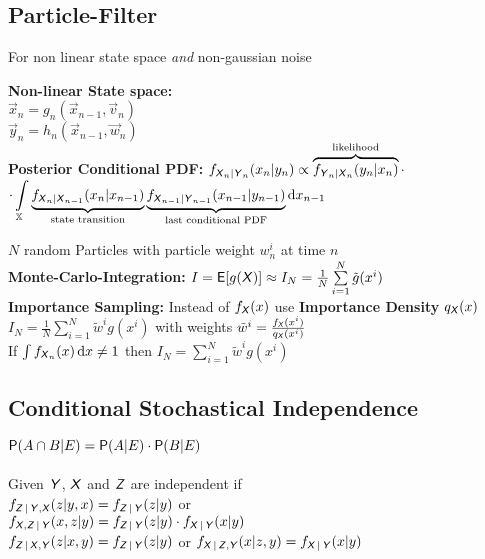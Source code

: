 \begin{sectionbox}
	\subsection{Particle-Filter}
	For non linear state space \emph{and} non-gaussian noise

	\textbf{Non-linear State space:}\\
	$\vec x_n = g_n(\vec x_{n−1}, \vec v_n)$\\
	$\vec y_n = h_n(\vec x_{n−1}, \vec w_n)$\\


	\textbf{Posterior Conditional PDF:} $f_{\X_n\!|\!\Y_n}(x_n|y_n) \propto \overbrace{ f_{\Y_n\!|\!\X_n}(y_n|x_n) }^{\text{likelihood}} \cdot$\\
	${ \displaystyle \cdot \int\limits_{\mathbb X} \underbrace{ f_{\X_n\!|\!\X_{n-1}}(x_n|x_{n-1}) }_{\text{state transition}} \underbrace{ f_{\X_{n-1}\!|\!\Y_{n-1}}(x_{n-1}|y_{n-1}) }_{\text{last conditional PDF}} \diff x_{n-1} }$


	$N$ random Particles with particle weight $w_n^i$ at time $n$\\
	\textbf{Monte-Carlo-Integration:}
	$I = \E[g(\X)] \approx I_N = \frac{1}{N} \sum\limits_{i=1}^{N} \tilde g(x^i)$\\
	\textbf{Importance Sampling:} Instead of $f_{\X}(x)$ use \textbf{Importance Density} $q_{\X}(x)$\\
	$I_N = \frac{1}{N} \sum\limits_{i=1}^{N} \tilde w^i g(x^i)$ with weights $\tilde w^i = \frac{f_{\X}(x^i)}{q_{\X}(x^i)}$\\
	If $\int f_{\X_n}(x) \diff x \ne 1$ then $I_N = \sum\limits_{i=1}^{N} \tilde w^i g(x^i)$\\
\end{sectionbox}

\begin{sectionbox}
	\subsection{Conditional Stochastical Independence}
	$\P(A \cap B | E) = \P(A | E) \cdot \P(B | E)$\\
	\\
	Given $\Y$, $\X$ and $\Z$ are independent if\\
	$f_{\Z|\Y,\X} (z | y, x) = f_{\Z|\Y}(z|y)$ or\\
	$f_{\X,\Z|\Y} (x,z|y) = f_{\Z|\Y}(z|y) \cdot f_{\X|\Y}(x|y)$\\
	$f_{\Z|\X,\Y}(z|x,y) = f_{\Z|\Y}(z|y)$ or $f_{\X|\Z,\Y}(x|z,y) = f_{\X|\Y}(x|y)$



\end{sectionbox}
